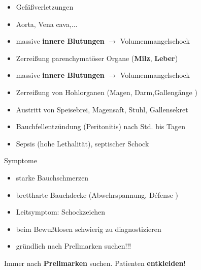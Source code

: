 \documentclass{article}
\newcommand\gEs[1]{\textbf{\textcolor[rgb]{0.0,0.0,0.5019608}{#1}}}
\newcommand\gEs[1]{\textbf{\textcolor[rgb]{0.0,0.0,0.5019608}{#1}}}
\begin{document}
\begin{itemize}
\item {\mdseries
Gef\"a{\ss}verletzungen}

\end{itemize}
\begin{itemize}
\item {\mdseries
Aorta, Vena cava,...}

\item {\mdseries
massive \gEs{innere Blutungen} ${\rightarrow}$
Volumenmangelschock}

\end{itemize}
\begin{itemize}
\item {\mdseries
Zerrei{\ss}ung  parenchymat\"oser Organe (\gEs{Milz},
\gEs{Leber})}

\end{itemize}
\begin{itemize}
\item {\mdseries
massive \gEs{innere Blutungen} ${\rightarrow}$
Volumenmangelschock}

\end{itemize}
\begin{itemize}
\item {\mdseries
Zerrei{\ss}ung  von Hohlorganen (Magen, Darm,Galleng\"ange )}

\end{itemize}
\begin{itemize}
\item {\mdseries
Austritt von Speisebrei, Magensaft, Stuhl, Gallensekret}

\end{itemize}
\begin{itemize}
\item {\mdseries
Bauchfellentz\"undung (Peritonitis) nach Std. bis  Tagen}

\item {\mdseries
Sepsis (hohe Lethalit\"at), septischer Schock}

\end{itemize}
{\mdseries\color{black}
Symptome}

\begin{itemize}
\item {\mdseries
starke  Bauchschmerzen}

\item {\mdseries
brettharte  Bauchdecke  (Abwehrspannung, D\'efense )}

\item {\mdseries
Leitsymptom: Schockzeichen}

\item {\mdseries
beim Bewu{\ss}tlosen schwierig zu  diagnostizieren}

\end{itemize}
\begin{itemize}
\item {\mdseries
gr\"undlich nach Prellmarken suchen!!!}

\end{itemize}
{\centering\color{black}
Immer nach \gEs{Prellmarken} suchen. Patienten
\gEs{entkleiden}!
\par}
\end{document}
